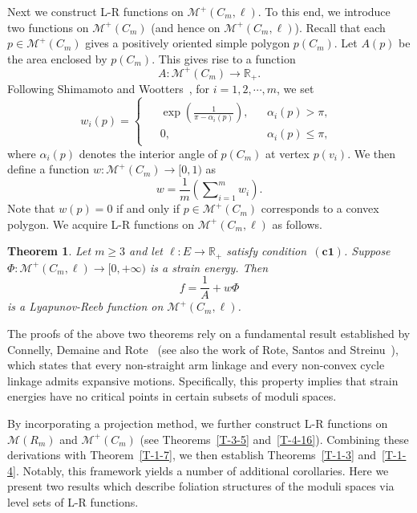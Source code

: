 \documentclass[11pt,letterpaper]{amsart}
\theoremstyle{plain}
\newtheorem{theorem}{Theorem}[section]
\theoremstyle{definition}
\theoremstyle{remark}
\numberwithin{equation}{section}
\begin{document}
Next we construct L-R functions on $\mathcal M^{+}(C_m,\ell)$. To this end, we introduce two functions on $\mathcal M^{+}(C_m)$ (and hence on $\mathcal M^{+}(C_m,\ell)$).
Recall that each $p\in \mathcal M^{+}(C_m)$ gives a positively oriented simple polygon $p(C_m)$. Let $A(p)$ be the area enclosed by $p(C_m)$. This gives rise to a function
\[
A: \mathcal M^{+}(C_m)\to \mathbb R_{+}.
\]
Following Shimamoto and Wootters~\cite{Shimamoto-2014}, for $i=1,2,\cdots,m$, we set
\[
w_i(p)=
\begin{cases}
\begin{aligned}
&\exp\left(\frac{1}{\pi-\alpha_i(p)}\right), &&\alpha_i(p)>\pi,\\
&0, &&\alpha_i(p)\leq\pi,
\end{aligned}
\end{cases}
\]
where $\alpha_i(p)$ denotes the interior angle of $p(C_m)$ at vertex $p(v_i)$. We then define a function $w: \mathcal M^{+}(C_m)\to [0,1)$ as
\[
w=\frac{1}{m}\left(\sum\nolimits_{i=1}^m w_i\right).
\]
Note that $w(p)=0$ if and only if $p\in \mathcal M^{+}(C_m)$ corresponds to a convex polygon. We acquire L-R functions on $\mathcal M^{+}(C_m,\ell)$ as follows.

\begin{theorem}\label{T-1-12}
Let $m\geq 3$ and let $\ell:E\to\mathbb R_{+}$ satisfy condition~$\mathrm{\mathbf{(c1)}}$. Suppose $\Phi:\mathcal M^{+}(C_m,\ell)\to [0,+\infty)$ is a strain energy. Then
\[
f=\frac{1}{A}+w\Phi
\]
is a Lyapunov-Reeb function on $\mathcal M^{+}(C_m,\ell)$.
\end{theorem}

The proofs of the above two theorems rely on a fundamental result established by Connelly, Demaine and Rote~\cite{Connelly-2003} (see also the work of Rote, Santos and Streinu~\cite{Rote-2003}), which states that every non-straight arm linkage and every non-convex cycle linkage admits expansive motions. Specifically, this property implies that strain energies have no critical points in certain subsets of moduli spaces.

By incorporating a projection method, we further construct L-R functions on $\mathcal M(R_m)$ and $\mathcal M^{+}(C_m)$ (see Theorems~\ref{T-3-5} and~\ref{T-4-16}). Combining these derivations with Theorem~\ref{T-1-7}, we then establish Theorems~\ref{T-1-3} and~\ref{T-1-4}. Notably, this framework yields a number of additional corollaries. Here we present two results which describe foliation structures of the moduli spaces via level sets of L-R functions.
\end{document}
